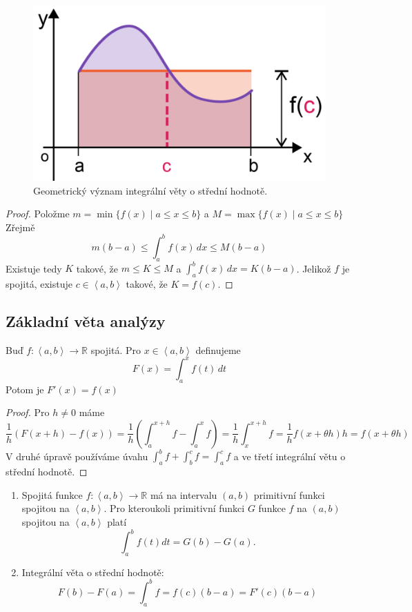 \documentclass[../main.tex]{subfiles}
\begin{document}
\begin{figure}[h]
	\centering
	\includegraphics[width=0.4\linewidth]{08-mean-value}%
	\caption{Geometrický význam integrální věty o střední hodnotě.}
\end{figure}

\begin{proof}
	Položme $m = \min \{ f(x) \mid a \leq x \leq b \}$ a $M = \max \{ f(x) \mid a \leq x \leq b \} $
	Zřejmě
	\[ m(b-a) \leq \int_{a}^{b} f(x) \,dx \leq M(b-a) \]
	Existuje tedy $K$ takové, že $m \leq K \leq M$ a $\int_{a}^{b} f(x) \,dx = K(b-a)$.
	Jelikož $f$ je spojitá, existuje $c \in \left< a,b \right>$ takové, že $K = f(c)$.
\end{proof}

\subsection{Základní věta analýzy}
\begin{theorem}
	Buď $f: \left< a,b \right> \to \mathbb{R}$ spojitá. Pro $x \in \left< a,b \right>$ definujeme
	\[ F(x) = \int_{a}^{x} f(t) \,dt \]
	Potom je $F'(x) = f(x)$
\end{theorem}

\begin{proof}
	Pro $h\neq 0$ máme
	\[ \frac{1}{h}(F(x+h) - f(x)) =\frac{1}{h}\left( \int_{a}^{x+h} f - \int_{a}^{x} f \right) =
	\frac{1}{h} \int_{x}^{x+h} f = \frac{1}{h}f(x + \theta h)h = f(x + \theta h) \]
	V druhé úpravě používáme úvahu $\int_a^b f+ \int_b^c f = \int_a^c f$ a ve třetí integrální větu o střední hodnotě.
\end{proof}

\begin{consequence}
	\hfill
	\begin{enumerate}
	    \item Spojitá funkce $f : \left<a,b\right> \rightarrow \mathbb{R}$ má na intervalu $(a,b)$ primitivní funkci spojitou na $\left<a,b\right>$.
	          Pro kteroukoli primitivní funkci $G$ funkce $f$ na $(a,b)$ spojitou na $\left<a,b\right>$ platí
	          \[\int^b_a f(t)dt = G(b) - G(a).\]
	    \item Integrální věta o střední hodnotě:
	    \[F(b) - F(a) = \int^b_a f = f(c)(b-a) = F'(c)(b-a)\]
	\end{enumerate}
\end{consequence}
\end{document}

